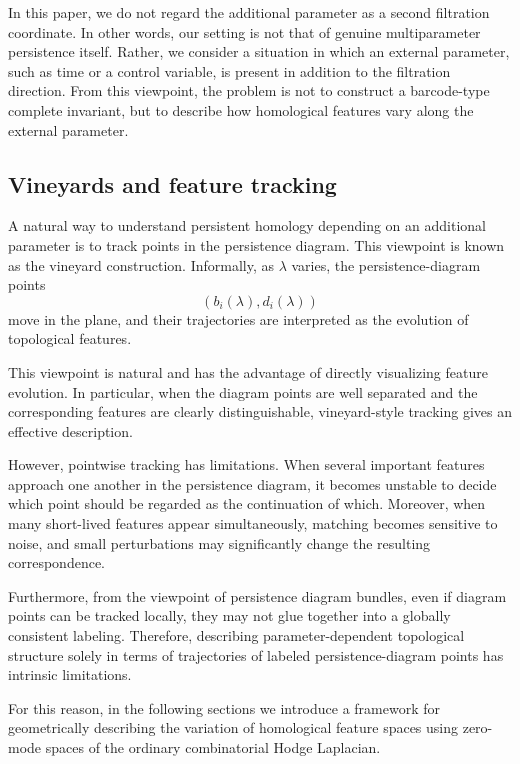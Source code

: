 \documentclass[pdflatex,sn-mathphys-num]{sn-jnl}%
\theoremstyle{thmstyleone}%
\theoremstyle{thmstyletwo}%
\theoremstyle{thmstylethree}%
\begin{document}
In this paper, we do not regard the additional parameter as a second filtration coordinate. In other words, our setting is not that of genuine multiparameter persistence itself. Rather, we consider a situation in which an external parameter, such as time or a control variable, is present in addition to the filtration direction. From this viewpoint, the problem is not to construct a barcode-type complete invariant, but to describe how homological features vary along the external parameter.

\subsection{Vineyards and feature tracking}

A natural way to understand persistent homology depending on an additional parameter is to track points in the persistence diagram. This viewpoint is known as the vineyard construction. Informally, as \(\lambda\) varies, the persistence-diagram points
\[
(b_i(\lambda),d_i(\lambda))
\]
move in the plane, and their trajectories are interpreted as the evolution of topological features.

This viewpoint is natural and has the advantage of directly visualizing feature evolution. In particular, when the diagram points are well separated and the corresponding features are clearly distinguishable, vineyard-style tracking gives an effective description.

However, pointwise tracking has limitations. When several important features approach one another in the persistence diagram, it becomes unstable to decide which point should be regarded as the continuation of which. Moreover, when many short-lived features appear simultaneously, matching becomes sensitive to noise, and small perturbations may significantly change the resulting correspondence.

Furthermore, from the viewpoint of persistence diagram bundles, even if diagram points can be tracked locally, they may not glue together into a globally consistent labeling. Therefore, describing parameter-dependent topological structure solely in terms of trajectories of labeled persistence-diagram points has intrinsic limitations.

For this reason, in the following sections we introduce a framework for geometrically describing the variation of homological feature spaces using zero-mode spaces of the ordinary combinatorial Hodge Laplacian.
\end{document}
